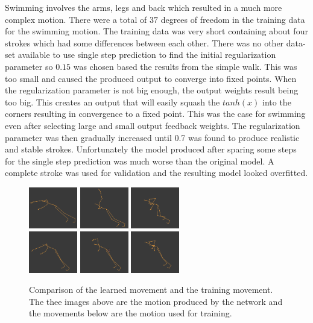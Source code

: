 \documentclass[letterpaper,9pt]{article}
\begin{document}
Swimming involves the arms, legs and back which resulted in a much more complex motion. There were a total of $37$ degrees of freedom in the training data for the swimming motion. The training data was very short containing about four strokes which had some differences between each other. There was no other data-set available to use single step prediction to find the initial regularization parameter so $0.15$ was chosen based the results from the simple walk. This was too small and caused the produced output to converge into fixed points. When the regularization parameter is not big enough, the output weights result being too big. This creates an output that will easily squash the $tanh(x)$ into the corners resulting in convergence to a fixed point. This was the case for swimming even after selecting large and small output feedback weights. The regularization parameter was then gradually increased until 0.7 was found to produce realistic and stable strokes. Unfortunately the model produced after sparing some steps for the single step prediction was much worse than the original model. A complete stroke was used for validation and the resulting model looked overfitted. \pagebreak

\begin{figure}[h!]
  \centering
  \includegraphics[width=80px]{Extra/out_swim_1.png}
  \includegraphics[width=80px]{Extra/out_swim_2.png}
  \includegraphics[width=80px]{Extra/out_swim_3.png}\\
  \includegraphics[width=80px]{Extra/teach_swim_1.png}
  \includegraphics[width=80px]{Extra/teach_swim_2.png}
  \includegraphics[width=80px]{Extra/teach_swim_3.png}
    \caption[Swimming]{Comparison of the learned movement and the training movement. The thee images above are the motion produced by the network and the movements below are the motion used for training.}
\end{figure}
\end{document}
